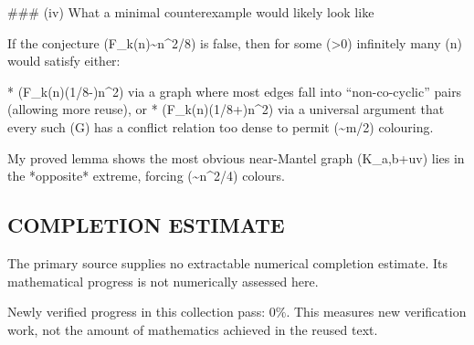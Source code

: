 ### (iv) What a minimal counterexample would likely look like

If the conjecture (F_k(n)\sim n^2/8) is false, then for some (\varepsilon>0) infinitely many (n) would satisfy either:

* (F_k(n)\le (1/8-\varepsilon)n^2) via a graph where most edges fall into “non-co-cyclic” pairs (allowing more reuse), or
* (F_k(n)\ge (1/8+\varepsilon)n^2) via a universal argument that every such (G) has a conflict relation too dense to permit (\sim m/2) colouring.

My proved lemma shows the most obvious near-Mantel graph (K_{a,b}+uv) lies in the *opposite* extreme, forcing (\sim n^2/4) colours.


\subsection*{COMPLETION ESTIMATE}
The primary source supplies no extractable numerical completion estimate. Its mathematical progress is not numerically assessed here.

Newly verified progress in this collection pass: $0\%$. This measures new verification work, not the amount of mathematics achieved in the reused text.
